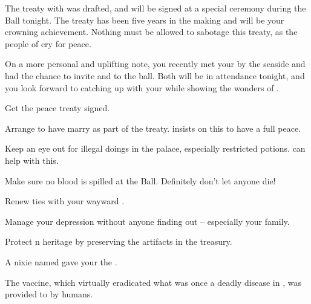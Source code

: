 \documentclass[char]{NeptuneBall}
\begin{document}
The treaty with \pPacifica{} was drafted, and will be signed at a special ceremony during the Ball tonight. The treaty has been five years in the making and will be your crowning achievement. Nothing must be allowed to sabotage this treaty, as the people of \pAtlantis{} cry for peace.

On a more personal and uplifting note, you recently met your \cAriel{\offspring} by the seaside and had the chance to invite \cAriel{\them} and \cAriel{\their} \cWillow{\offspring} to the ball. Both will be in attendance tonight, and you look forward to catching up with your \cAriel{\offspring} while showing \cWillow{} the wonders of \pAtlantis{}.

\begin{itemz}[Goals]
  \item Get the peace treaty signed.
  \item Arrange to have \cPrincess{} marry \cPrince{} as part of the treaty. \pPacifica{} insists on this to have a full peace.
  \item Keep an eye out for illegal doings in the palace, especially restricted potions. \cReporter{} can help with this.
  \item Make sure no blood is spilled at the Ball. Definitely don't let anyone die!
  \item Renew ties with your wayward \cAriel{\offspring}.
  \item Manage your depression without anyone finding out -- especially your family.
  \item Protect \pAtlantis{}n heritage by preserving the artifacts in the treasury.
\end{itemz}

\begin{itemz}[Trivia]
	\item A nixie named \cNixie{} gave your \cExKing{\parent} the \iTrident{}.
  \item The \pPolio{} vaccine, which virtually eradicated what was once a deadly disease in \pAtlantis{}, was provided to \pAtlantis{} by humans.
\end{itemz}
\end{document}
